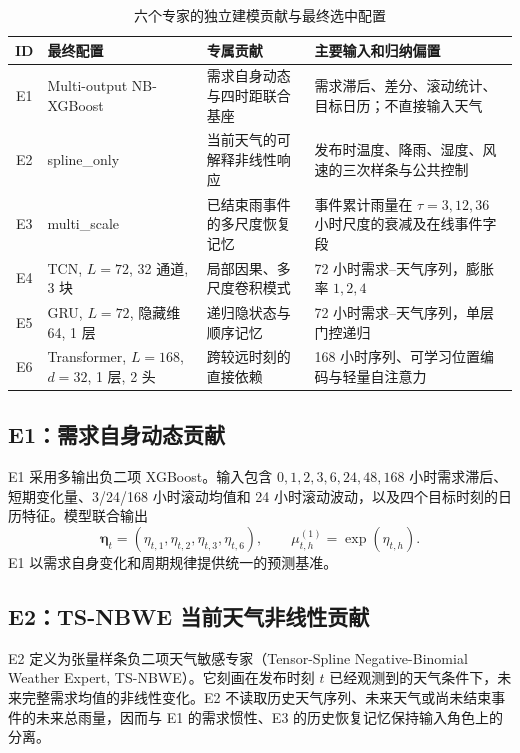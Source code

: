 \documentclass[UTF8,11pt,a4paper]{ctexart}
\begin{document}
\begin{table}[H]
\centering
\caption{六个专家的独立建模贡献与最终选中配置}
\label{tab:experts}
\small
\begin{tabularx}{\textwidth}{c p{3.0cm} p{4.0cm} X}
\toprule
ID & 最终配置 & 专属贡献 & 主要输入和归纳偏置\\
\midrule
E1 & Multi-output NB-XGBoost & 需求自身动态与四时距联合基座 & 需求滞后、差分、滚动统计、目标日历；不直接输入天气\\
E2 & spline\_only & 当前天气的可解释非线性响应 & 发布时温度、降雨、湿度、风速的三次样条与公共控制\\
E3 & multi\_scale & 已结束雨事件的多尺度恢复记忆 & 事件累计雨量在 $\tau=3,12,36$ 小时尺度的衰减及在线事件字段\\
E4 & TCN, $L=72$, 32 通道, 3 块 & 局部因果、多尺度卷积模式 & 72 小时需求--天气序列，膨胀率 $1,2,4$\\
E5 & GRU, $L=72$, 隐藏维 64, 1 层 & 递归隐状态与顺序记忆 & 72 小时需求--天气序列，单层门控递归\\
E6 & Transformer, $L=168$, $d=32$, 1 层, 2 头 & 跨较远时刻的直接依赖 & 168 小时序列、可学习位置编码与轻量自注意力\\
\bottomrule
\end{tabularx}
\end{table}

\subsection{E1：需求自身动态贡献}

E1 采用多输出负二项 XGBoost。输入包含 $0,1,2,3,6,24,48,168$ 小时需求滞后、短期变化量、3/24/168 小时滚动均值和 24 小时滚动波动，以及四个目标时刻的日历特征。模型联合输出
\begin{equation}
  \bm\eta_t=(\eta_{t,1},\eta_{t,2},\eta_{t,3},\eta_{t,6}),\qquad
  \mu^{(1)}_{t,h}=\exp(\eta_{t,h}).
\end{equation}
E1 以需求自身变化和周期规律提供统一的预测基准。

\subsection{E2：TS-NBWE 当前天气非线性贡献}

E2 定义为张量样条负二项天气敏感专家（Tensor-Spline Negative-Binomial Weather Expert, TS-NBWE）。它刻画在发布时刻 $t$ 已经观测到的天气条件下，未来完整需求均值的非线性变化。E2 不读取历史天气序列、未来天气或尚未结束事件的未来总雨量，因而与 E1 的需求惯性、E3 的历史恢复记忆保持输入角色上的分离。
\end{document}
